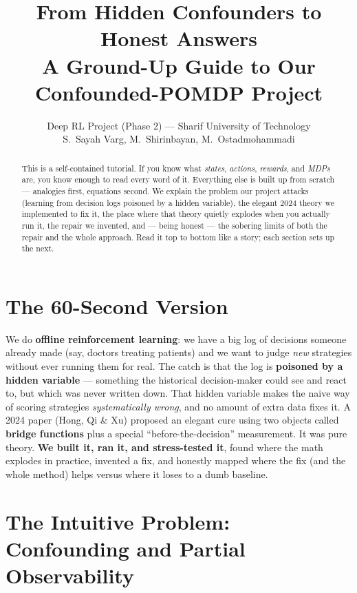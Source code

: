 \documentclass[11pt]{article}
\title{\vspace{-1.5em}\textbf{From Hidden Confounders to Honest Answers}\\[0.3em]
\large A Ground-Up Guide to Our Confounded-POMDP Project}
\author{Deep RL Project (Phase 2) --- Sharif University of Technology\\
S.~Sayah Varg, M.~Shirinbayan, M.~Ostadmohammadi}
\date{}
\begin{document}
\maketitle

\begin{abstract}
\noindent This is a self-contained tutorial. If you know what \emph{states},
\emph{actions}, \emph{rewards}, and \emph{MDPs} are, you know enough to read every
word of it. Everything else is built up from scratch --- analogies first, equations
second. We explain the problem our project attacks (learning from decision logs
poisoned by a hidden variable), the elegant 2024 theory we implemented to fix it,
the place where that theory quietly explodes when you actually run it, the repair we
invented, and --- being honest --- the sobering limits of both the repair and the
whole approach. Read it top to bottom like a story; each section sets up the next.
\end{abstract}

\tableofcontents
\vspace{1em}

\section*{The 60-Second Version}

We do \textbf{offline reinforcement learning}: we have a big log of decisions someone
already made (say, doctors treating patients) and we want to judge \emph{new}
strategies without ever running them for real. The catch is that the log is
\textbf{poisoned by a hidden variable} --- something the historical decision-maker
could see and react to, but which was never written down. That hidden variable makes
the naive way of scoring strategies \emph{systematically wrong}, and no amount of
extra data fixes it. A 2024 paper (Hong, Qi \& Xu) proposed an elegant cure using two
objects called \textbf{bridge functions} plus a special ``before-the-decision''
measurement. It was pure theory. \textbf{We built it, ran it, and stress-tested it},
found where the math explodes in practice, invented a fix, and honestly mapped where
the fix (and the whole method) helps versus where it loses to a dumb baseline.

\section{The Intuitive Problem: Confounding and Partial Observability}
\end{document}
